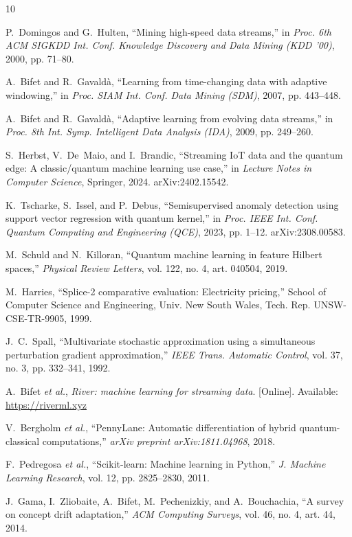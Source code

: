 \documentclass[conference]{IEEEtran}
\begin{document}
\begin{thebibliography}{10}

P.~Domingos and G.~Hulten, ``Mining high-speed data streams,'' in \emph{Proc. 6th ACM
SIGKDD Int. Conf. Knowledge Discovery and Data Mining (KDD '00)}, 2000, pp. 71--80.

A.~Bifet and R.~Gavald\`{a}, ``Learning from time-changing data with adaptive
windowing,'' in \emph{Proc. SIAM Int. Conf. Data Mining (SDM)}, 2007, pp. 443--448.

A.~Bifet and R.~Gavald\`{a}, ``Adaptive learning from evolving data streams,'' in
\emph{Proc. 8th Int. Symp. Intelligent Data Analysis (IDA)}, 2009, pp. 249--260.

S.~Herbst, V.~De~Maio, and I.~Brandic, ``Streaming IoT data and the quantum edge: A
classic/quantum machine learning use case,'' in \emph{Lecture Notes in Computer Science},
Springer, 2024. arXiv:2402.15542.

K.~Tscharke, S.~Issel, and P.~Debus, ``Semisupervised anomaly detection using support
vector regression with quantum kernel,'' in \emph{Proc. IEEE Int. Conf. Quantum Computing
and Engineering (QCE)}, 2023, pp. 1--12. arXiv:2308.00583.

M.~Schuld and N.~Killoran, ``Quantum machine learning in feature Hilbert spaces,''
\emph{Physical Review Letters}, vol. 122, no. 4, art. 040504, 2019.

M.~Harries, ``Splice-2 comparative evaluation: Electricity pricing,'' School of Computer
Science and Engineering, Univ. New South Wales, Tech. Rep. UNSW-CSE-TR-9905, 1999.

J.~C.~Spall, ``Multivariate stochastic approximation using a simultaneous perturbation
gradient approximation,'' \emph{IEEE Trans. Automatic Control}, vol. 37, no. 3,
pp. 332--341, 1992.

A.~Bifet \textit{et al.}, \emph{River: machine learning for streaming data}. [Online].
Available: \url{https://riverml.xyz}

V.~Bergholm \textit{et al.}, ``PennyLane: Automatic differentiation of hybrid
quantum-classical computations,'' \emph{arXiv preprint arXiv:1811.04968}, 2018.

F.~Pedregosa \textit{et al.}, ``Scikit-learn: Machine learning in Python,''
\emph{J. Machine Learning Research}, vol. 12, pp. 2825--2830, 2011.

J.~Gama, I.~Zliobaite, A.~Bifet, M.~Pechenizkiy, and A.~Bouchachia, ``A survey on concept
drift adaptation,'' \emph{ACM Computing Surveys}, vol. 46, no. 4, art. 44, 2014.

\end{thebibliography}
\end{document}
